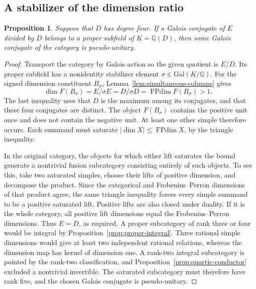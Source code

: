 \documentclass[11pt,a4paper]{article}
\newtheorem{proposition}[theorem]{Proposition}
\numberwithin{equation}{section}
\begin{document}
\subsection{A stabilizer of the dimension ratio}
\begin{proposition}\label{prop:stab}
Suppose that $D$ has degree four. If a Galois conjugate of $E$ divided
by $D$ belongs to a proper subfield of $K=\mathbb Q(D)$, then some Galois
conjugate of the category is pseudo-unitary.
\end{proposition}
\begin{proof}
Transport the category by Galois action so the given quotient is
$E/D$. Its proper subfield has a nonidentity stabilizer element
$\sigma\in\mathrm{Gal}(K/\mathbb Q)$. For the signed dimension
constituent $B_\sigma$, Lemma~\ref{lem:simultaneous-columns} gives
\[
 \dim F(B_\sigma)=E/\sigma E=D/\sigma D=\operatorname{FPdim}F(B_\sigma)>1.
\]
The last inequality uses that $D$ is the maximum among its conjugates,
and that these four conjugates are distinct. The object $F(B_\sigma)$
contains the positive unit once and does not contain the negative
unit. At least one other simple therefore occurs. Each summand must
saturate $|\dim X|\le\operatorname{FPdim}X$, by the triangle inequality.

In the original category, the objects for which either lift saturates
the bound generate a nontrivial fusion subcategory consisting entirely
of such objects. To see this, take two saturated simples, choose their
lifts of positive dimension, and decompose the product. Since the
categorical and Frobenius--Perron dimensions of that product agree,
the same triangle inequality forces every simple summand to be a
positive saturated lift. Positive lifts are also closed under duality.
If it is the whole category, all positive lift dimensions equal the
Frobenius--Perron dimensions. Thus $E=D$, as required. A proper subcategory of rank three or four would be integral by Proposition~\ref{prop:proper-integral}. Three rational simple dimensions would give at least two independent rational relations, whereas the dimension map has kernel of dimension one. A rank-two integral subcategory is pointed by the rank-two classification, and Proposition~\ref{prop:quartic-conductor} excluded a nontrivial invertible. The saturated subcategory must therefore have rank five, and the chosen
Galois conjugate is pseudo-unitary.
\end{proof}
\end{document}
